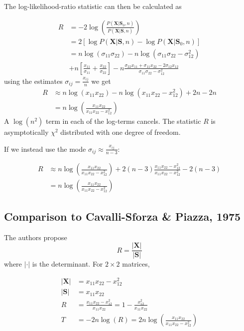 \documentclass[12pt, letterpaper]{article}
\newcommand{\MX}{\mathbf{X}}
\newcommand{\MS}{\mathbf{S}}
\begin{document}
The log-likelihood-ratio statistic can then be calculated as 

\begin{align}
    R &= - 2 \log  \left( \frac{P(\MX | \MS_0, n)}{ P(\MX | \MS, n)} \right)  \nonumber\\
    &=2 [\log P(\MX | \MS, n) - \log P(\MX | \MS_0, n) ] \nonumber\\
    &=  n \log \left( \sigma_{11}\sigma_{22}\right) - n \log \left( \sigma_{11}\sigma_{22} - \sigma_{12}^2\right)  \nonumber\\
    &+  n\left[\frac{x_{11}}{\sigma_{11}}  + \frac{x_{22}}{\sigma_{22}}\right] 
    - n\frac{\sigma_{22}x_{11} + \sigma_{11}x_{22} -2 \sigma_{12}x_{12}} {\sigma_{11}\sigma_{22} -  \sigma_{12}^2} 
\end{align}
using the estimates $\sigma_{ij} = \frac{x_{ij}}{n}$ we get
\begin{align}
    R&\approx n \log \left( x_{11}x_{22}\right) - n \log \left( x_{11}x_{22} - x_{12}^2\right) + 2n - 2n  \nonumber\\
     &= n  \log \left( \frac{x_{11}x_{22}}{x_{11}x_{22} - x_{12}^2}  \right)
\end{align}
 A $\log(n^2)$ term in each of the log-terms cancels. The statistic $R$ is asymptotically $\chi^2$ distributed with one degree of freedom.

If we instead use the mode $\sigma_{ij} \approx \frac{x_{ij}}{n-3}$:

\begin{align}
    R&\approx n  \log \left( \frac{x_{11}x_{22}}{x_{11}x_{22} - x_{12}^2}  \right)
+2 (n-3) \frac{x_{11}x_{22} - x_{12}^2} {x_{11}x_{22} -  x_{12}^2} 
    - 2(n-3) \nonumber\\
     &= n  \log \left( \frac{x_{11}x_{22}}{x_{11}x_{22} - x_{12}^2}  \right)
\end{align}

\subsection{Comparison to Cavalli-Sforza \& Piazza, 1975}
The authors propose 
\begin{equation}
    R = \frac{|\MX|}{|\MS|}
\end{equation}
where $|\cdot|$ is the determinant. For $2 \times 2$ matrices,


\begin{align}
|\MX| &= x_{11}x_{22} - x_{12}^2 \\
|\MS| &= x_{11}x_{22} \\
    R &= \frac{ x_{11}x_{22} - x_{12}^2}{ x_{11}x_{22}} =1 - \frac{ x_{12}^2}{ x_{11}x_{22}}\\
    T &= -2 n \log (R) = 2 n \log \left( \frac{ x_{11}x_{22}}{ x_{11}x_{22} - x_{12}^2}\right)
\end{align}
\end{document}
